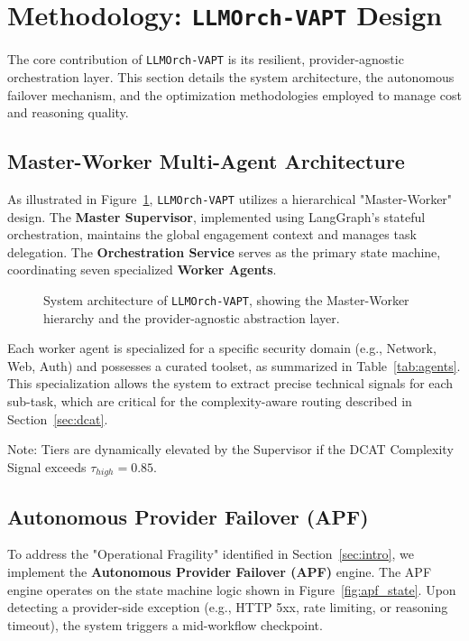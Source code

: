\section{Methodology: \texttt{LLMOrch-VAPT} Design}
\label{sec:methodology}

The core contribution of \texttt{LLMOrch-VAPT} is its resilient, provider-agnostic orchestration layer. This section details the system architecture, the autonomous failover mechanism, and the optimization methodologies employed to manage cost and reasoning quality.

\subsection{Master-Worker Multi-Agent Architecture}
As illustrated in Figure~\ref{fig:architecture}, \texttt{LLMOrch-VAPT} utilizes a hierarchical "Master-Worker" design. The \textbf{Master Supervisor}, implemented using LangGraph's stateful orchestration, maintains the global engagement context and manages task delegation. The \textbf{Orchestration Service} serves as the primary state machine, coordinating seven specialized \textbf{Worker Agents}.

\begin{figure}[!t]
    \centering
    \resizebox{\columnwidth}{!}{
        
    }
    \caption{System architecture of \texttt{LLMOrch-VAPT}, showing the Master-Worker hierarchy and the provider-agnostic abstraction layer.}
    \label{fig:architecture}
\end{figure}

Each worker agent is specialized for a specific security domain (e.g., Network, Web, Auth) and possesses a curated toolset, as summarized in Table~\ref{tab:agents}. This specialization allows the system to extract precise technical signals for each sub-task, which are critical for the complexity-aware routing described in Section~\ref{sec:dcat}.

\begin{table}[!t]
    \centering
    \caption{Specialized Worker Agent Roles and Resource Allocation}
    \label{tab:agents}
    \resizebox{\columnwidth}{!}{
        
    }
    \vspace{1mm}
    \footnotesize{Note: Tiers are dynamically elevated by the Supervisor if the DCAT Complexity Signal exceeds $\tau_{high} = 0.85$.}
\end{table}

\subsection{Autonomous Provider Failover (APF)}
\label{sec:apf}
To address the "Operational Fragility" identified in Section~\ref{sec:intro}, we implement the \textbf{Autonomous Provider Failover (APF)} engine. The APF engine operates on the state machine logic shown in Figure~\ref{fig:apf_state}. Upon detecting a provider-side exception (e.g., HTTP 5xx, rate limiting, or reasoning timeout), the system triggers a mid-workflow checkpoint.


